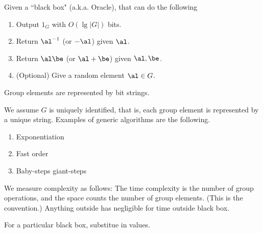 \begin{df}
Given a ``black box" (a.k.a. Oracle), that can do the following
\begin{enumerate}
\item
Output $1_G$ with $O(\lg|G|)$ bits.
\item 
Return $\al^{-1}$ (or $-\al$) given $\al$.
\item
Return $\al\be$ (or $\al+\be$) given $\al,\be$.
\item
(Optional) Give a random element $\al\in G$.
\end{enumerate}
Group elements are represented by bit strings. 
\end{df}
We assume $G$ is uniquely identified, that is, each group element is represented by a unique string.
Examples of generic algorithms are the following.
\begin{enumerate}
\item
Exponentiation
\item
Fast order
\item
Baby-steps giant-steps
\end{enumerate}
We measure complexity as follows: The time complexity is the number of group operations, and the space counts the number of group elements. (This is the convention.) Anything outside has negligible for time outside black box.

For a particular black box, substitue in values.
